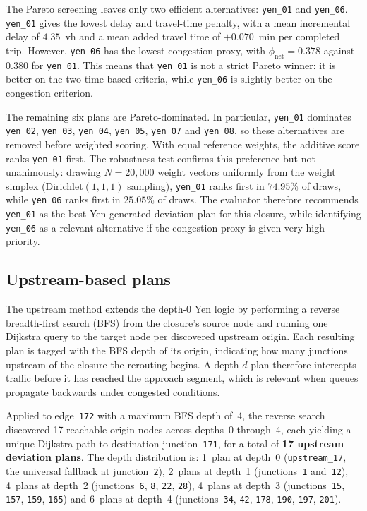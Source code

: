 The Pareto screening leaves only two efficient alternatives:
\texttt{yen\_01} and \texttt{yen\_06}. \texttt{yen\_01} gives the lowest
delay and travel-time penalty, with a mean incremental delay of
$4.35$~vh and a mean added travel time of $+0.070$~min per completed trip.
However, \texttt{yen\_06} has the lowest congestion proxy, with
$\phi_\text{net}=0.378$ against $0.380$ for \texttt{yen\_01}. This means
that \texttt{yen\_01} is not a strict Pareto winner: it is better on the two
time-based criteria, while \texttt{yen\_06} is slightly better on the
congestion criterion.

The remaining six plans are Pareto-dominated. In particular,
\texttt{yen\_01} dominates \texttt{yen\_02}, \texttt{yen\_03},
\texttt{yen\_04}, \texttt{yen\_05}, \texttt{yen\_07} and
\texttt{yen\_08}, so these alternatives are removed before weighted scoring.
With equal reference weights, the additive score ranks \texttt{yen\_01}
first. The robustness test confirms this preference but not unanimously:
drawing $N=20{,}000$ weight vectors uniformly from the weight simplex
(Dirichlet$(1,1,1)$ sampling), \texttt{yen\_01} ranks first in $74.95\%$
of draws, while \texttt{yen\_06} ranks first in $25.05\%$ of draws.
The evaluator therefore recommends \texttt{yen\_01} as the best
Yen-generated deviation plan for this closure, while identifying
\texttt{yen\_06} as a relevant alternative if the congestion proxy is given
very high priority.

\subsection{Upstream-based plans}

The upstream method extends the depth-0 Yen logic by performing a reverse
breadth-first search (BFS) from the closure's source node and running one
Dijkstra query to the target node per discovered upstream origin. Each
resulting plan is tagged with the BFS depth of its origin, indicating how many
junctions upstream of the closure the rerouting begins. A depth-$d$ plan
therefore intercepts traffic before it has reached the approach segment,
which is relevant when queues propagate backwards under congested conditions.

Applied to edge~\texttt{172} with a maximum BFS depth of~4, the reverse
search discovered 17 reachable origin nodes across depths~0 through~4, each
yielding a unique Dijkstra path to destination junction~\texttt{171}, for a total of
\textbf{17 upstream deviation plans}. The depth distribution is:
1~plan at depth~0 (\texttt{upstream\_17}, the universal fallback at
junction~\texttt{2}), 2~plans at depth~1
(junctions~\texttt{1} and~\texttt{12}), 4~plans at depth~2
(junctions~\texttt{6}, \texttt{8}, \texttt{22}, \texttt{28}), 4~plans
at depth~3 (junctions~\texttt{15}, \texttt{157}, \texttt{159},
\texttt{165}) and 6~plans at depth~4 (junctions~\texttt{34},
\texttt{42}, \texttt{178}, \texttt{190}, \texttt{197}, \texttt{201}).

